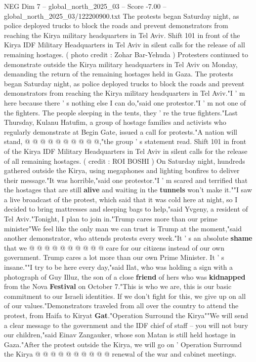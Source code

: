 \begin{textsample}{NEG Dim 7 – global\_north\_2025\_03 – Score -7.00 – global\_north\_2025\_03/122200900.txt}  \label{ex:f7_neg_130}
The protests began Saturday night, as police deployed trucks to block the roads and prevent demonstrators from reaching the Kirya military headquarters in Tel Aviv.
Shift 101 in front of the Kirya IDF Military Headquarters in Tel Aviv in silent calls for the release of all remaining hostages. ( photo credit : Zohar Bar-Yehuda ) Protesters continued to demonstrate outside the Kirya military headquarters in Tel Aviv on Monday, demanding the return of the remaining hostages held in Gaza.
The protests began Saturday night, as police deployed trucks to block the roads and prevent demonstrators from reaching the Kirya military headquarters in Tel Aviv."I ' m here because there ' s nothing else I can do,"said one protestor."I ' m not one of the fighters.
The people sleeping in the tents, they ' re the true fighters."Last Thursday, Kulanu Hatufim, a group of hostage families and activists who regularly demonstrate at Begin Gate, issued a call for protests."A nation will stand, @ @ @ @ @ @ @ @ @ @,"the group ' s statement read.
Shift 101 in front of the Kirya IDF Military Headquarters in Tel Aviv in silent calls for the release of all remaining hostages. ( credit : ROI BOSHI ) On Saturday night, hundreds gathered outside the Kirya, using megaphones and lighting bonfires to deliver their message."It was horrible,"said one protestor."I ' m scared and terrified that the hostages that are still \textbf{alive} and waiting in the \textbf{tunnels} won't make it.""I saw a live broadcast of the protest, which said that it was cold here at night, so I decided to bring mattresses and sleeping bags to help,"said Yvgeny, a resident of Tel Aviv."Tonight, I plan to join in."Trump cares more than our prime minister"We feel like the only man we can trust is Trump at the moment,"said another demonstrator, who attends protests every week."It ' s an absolute \textbf{shame} that we @ @ @ @ @ @ @ @ @ @ care for our citizens instead of our own government.
Trump cares a lot more than our own Prime Minister.
It ' s insane.""I try to be here every day,"said Ilat, who was holding a sign with a photograph of Guy Illuz, the son of a close \textbf{friend} of hers who was \textbf{kidnapped} from the Nova \textbf{Festival} on October 7."This is who we are, this is our basic commitment to our Israeli identities.
If we don't fight for this, we give up on all of our values."Demonstrators traveled from all over the country to attend the protest, from Haifa to Kiryat \textbf{Gat}."Operation Surround the Kirya""We will send a clear message to the government and the IDF chief of staff -- you will not bury our children,"said Einav Zangauker, whose son Matan is still held hostage in Gaza."After the protest outside the Kirya, we will go on ' Operation Surround the Kirya @ @ @ @ @ @ @ @ @ @ renewal of the war and cabinet meetings.

\end{textsample}
